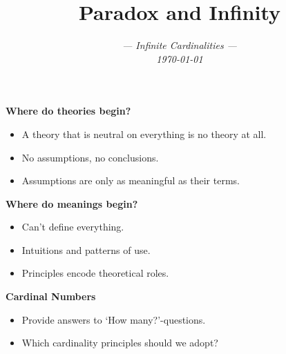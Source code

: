 \documentclass[handout]{beamer}
\title[Short title]{\LARGE Paradox and Infinity} %
\author{\it --- Infinite Cardinalities ---\\ \small \today } %
\date{} %
\begin{document}
\begin{frame}
\titlepage %
\end{frame}









\begin{frame}

  \textbf{Where do theories begin?} 

  \begin{itemize}
    \item A theory that is neutral on everything is no theory at all.
    \item No assumptions, no conclusions.
    \item Assumptions are only as meaningful as their terms.
  \end{itemize}
  \vspace{.2in}
  \pause

  \textbf{Where do meanings begin?} 

  \begin{itemize}
    \item Can't define everything.
    \item Intuitions and patterns of use.
    \item Principles encode theoretical roles.
  \end{itemize}
  \vspace{.2in}
  \pause

  \textbf{Cardinal Numbers}

  \begin{itemize}
    \item Provide answers to `How many?'-questions.
    \item Which cardinality principles should we adopt?
  \end{itemize}


\end{frame}
\end{document}
